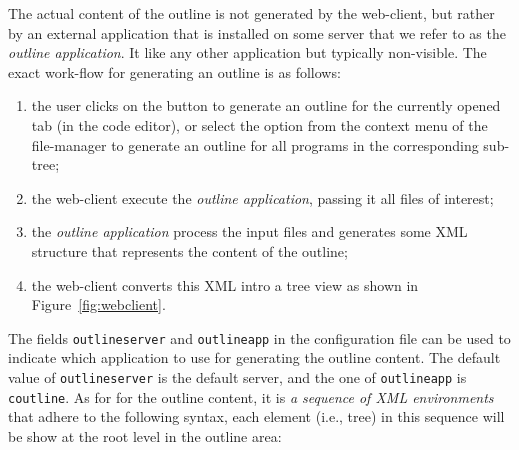 The actual content of the outline is not generated by the web-client,
but rather by an external application that is installed on some \ei
server that we refer to as the \emph{outline application}. It like any
other application but typically non-visible.  The exact work-flow for
generating an outline is as follows:
%
\begin{enumerate}

\item the user clicks on the  button to generate an
  outline for the currently opened tab (in the code editor), or select
  the  option from the context menu of the file-manager
  to generate an outline for all programs in the corresponding
  sub-tree;

\item the web-client execute the \emph{outline application}, passing
  it all files of interest;

\item the \emph{outline application} process the input files and
  generates some XML structure that represents the content of the
  outline;

\item the web-client converts this XML intro a tree view as shown in
  Figure~\ref{fig:webclient}.

\end{enumerate}
%
The fields \texttt{outlineserver} and \texttt{outlineapp} in the
configuration file can be used to indicate which application to use
for generating the outline content. The default value of
\texttt{outlineserver} is the default server, and the one of
\texttt{outlineapp} is \texttt{coutline}. As for for the outline
content, it is \emph{a sequence of XML environments} that adhere to
the following syntax, each element (i.e., tree) in this sequence will
be show at the root level in the outline area:

